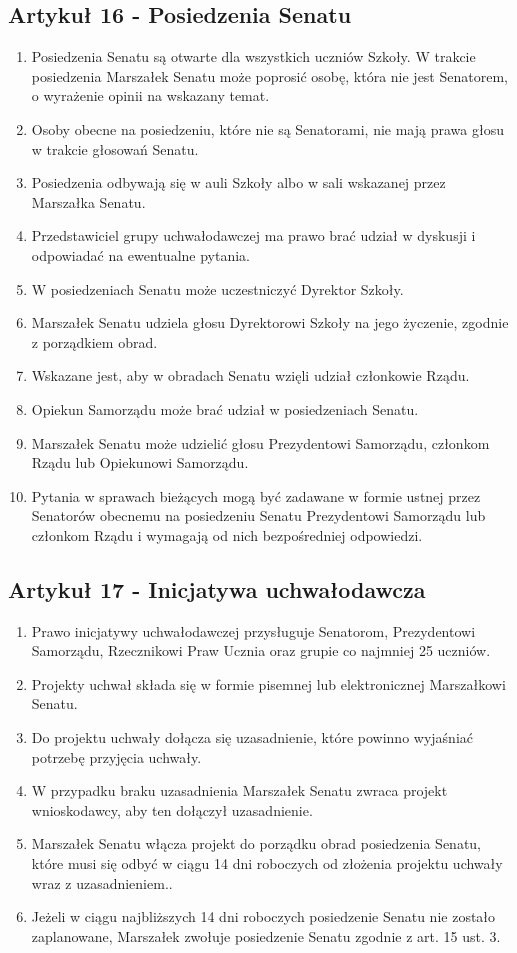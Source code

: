 \documentclass[14pt]{article}
\newenvironment{ustepy}{%
	\begin{enumerate}[leftmargin=1.5em, itemindent=1pt, labelwidth=1em, itemsep=5pt]
	}{%
	\end{enumerate}
}
\begin{document}
\subsection*{Artykuł 16 - Posiedzenia Senatu}
\begin{ustepy}
	\item Posiedzenia Senatu są otwarte dla wszystkich uczniów Szkoły. W trakcie posiedzenia Marszałek Senatu może poprosić osobę, która nie jest Senatorem, o wyrażenie opinii na wskazany temat.
	\item Osoby obecne na posiedzeniu, które nie są Senatorami, nie mają prawa głosu w trakcie głosowań Senatu. 
	\item Posiedzenia odbywają się w auli Szkoły albo w sali wskazanej przez Marszałka Senatu.
	\item Przedstawiciel grupy uchwałodawczej ma prawo brać udział w dyskusji i odpowiadać na ewentualne pytania.
	\item W posiedzeniach Senatu może uczestniczyć Dyrektor Szkoły.
	\item Marszałek Senatu udziela głosu Dyrektorowi Szkoły na jego życzenie, zgodnie z porządkiem obrad. 
	\item Wskazane jest, aby w obradach Senatu wzięli udział członkowie Rządu.
	\item Opiekun Samorządu może brać udział w posiedzeniach Senatu.
	\item Marszałek Senatu może udzielić głosu Prezydentowi Samorządu, członkom Rządu lub Opiekunowi Samorządu.
	\item Pytania w sprawach bieżących mogą być zadawane w formie ustnej przez Senatorów obecnemu na posiedzeniu Senatu Prezydentowi Samorządu lub członkom Rządu i wymagają od nich bezpośredniej odpowiedzi.
\end{ustepy}
\subsection*{Artykuł 17 - Inicjatywa uchwałodawcza}
\begin{ustepy}
	\item Prawo inicjatywy uchwałodawczej przysługuje Senatorom, Prezydentowi Samorządu, Rzecznikowi Praw Ucznia oraz grupie co najmniej 25 uczniów.
	\item Projekty uchwał składa się w formie pisemnej lub elektronicznej Marszałkowi Senatu.
	\item Do projektu uchwały dołącza się uzasadnienie, które powinno wyjaśniać potrzebę przyjęcia uchwały.
	\item W przypadku braku uzasadnienia Marszałek Senatu zwraca projekt wnioskodawcy, aby ten dołączył uzasadnienie.
	\item Marszałek Senatu włącza projekt do porządku obrad posiedzenia Senatu, które musi się odbyć w ciągu 14 dni roboczych od złożenia projektu uchwały wraz z uzasadnieniem..
	\item Jeżeli w ciągu najbliższych 14 dni roboczych posiedzenie Senatu nie zostało zaplanowane, Marszałek zwołuje posiedzenie Senatu zgodnie z art. 15 ust. 3.
\end{ustepy}
\newpage
\end{document}

